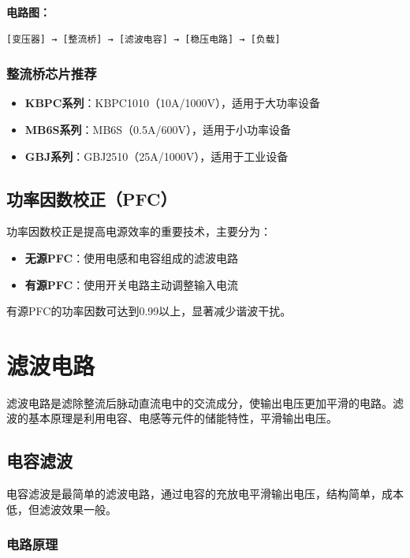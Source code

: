\documentclass[12pt,UTF8]{ctexbook}
\begin{document}
\textbf{电路图：}

\begin{verbatim}
[变压器] → [整流桥] → [滤波电容] → [稳压电路] → [负载]
\end{verbatim}

\subsubsection{整流桥芯片推荐}

\begin{itemize}
    \item \textbf{KBPC系列}：KBPC1010（10A/1000V），适用于大功率设备
    \item \textbf{MB6S系列}：MB6S（0.5A/600V），适用于小功率设备
    \item \textbf{GBJ系列}：GBJ2510（25A/1000V），适用于工业设备
\end{itemize}

\subsection{功率因数校正（PFC）}

功率因数校正是提高电源效率的重要技术，主要分为：

\begin{itemize}
    \item \textbf{无源PFC}：使用电感和电容组成的滤波电路
    \item \textbf{有源PFC}：使用开关电路主动调整输入电流
\end{itemize}

有源PFC的功率因数可达到0.99以上，显著减少谐波干扰。

\section{滤波电路}

滤波电路是滤除整流后脉动直流电中的交流成分，使输出电压更加平滑的电路。滤波的基本原理是利用电容、电感等元件的储能特性，平滑输出电压。

\subsection{电容滤波}

电容滤波是最简单的滤波电路，通过电容的充放电平滑输出电压，结构简单，成本低，但滤波效果一般。

\subsubsection{电路原理}
\end{document}
